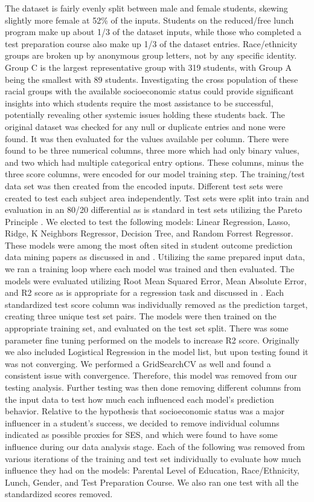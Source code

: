 \documentclass[man,floatsintext]{apa6} %
\begin{document}
The dataset is fairly evenly split between male and female students, skewing slightly more female at 52\% of the inputs. Students on the reduced/free lunch program make up about 1/3 of the dataset inputs, while those who completed a test preparation course also make up 1/3 of the dataset entries. Race/ethnicity groups are broken up by anonymous group letters, not by any specific identity. Group C is the largest representative group with 319 students, with Group A being the smallest with 89 students. Investigating the cross population of these racial groups with the available socioeconomic status could provide significant insights into which students require the most assistance to be successful, potentially revealing other systemic issues holding these students back.
The original dataset was checked for any null or duplicate entries and none were found. It was then evaluated for the values available per column. There were found to be three numerical columns, three more which had only binary values, and two which had multiple categorical entry options. These columns, minus the three score columns, were encoded for our model training step.
The training/test data set was then created from the encoded inputs. Different test sets were created to test each subject area independently. Test sets were split into train and evaluation in an 80/20 differential as is standard in test sets utilizing the Pareto Principle \cite{ParetoSplit}.
We elected to test the following models: Linear Regression, Lasso, Ridge, K Neighbors Regressor, Decision Tree, and Random Forrest Regressor. These models were among the most often sited in student outcome prediction data mining papers as discussed in \cite{MLMoodle} and \cite{dataMineLit}. Utilizing the same prepared input data, we ran a training loop where each model was trained and then evaluated. The models were evaluated utilizing Root Mean Squared Error, Mean Absolute Error, and R2 score as is appropriate for a regression task and discussed in \cite{measuremetrics}.
Each standardized test score column was individually removed as the prediction target, creating three unique test set pairs. The models were then trained on the appropriate training set, and evaluated on the test set split. There was some parameter fine tuning performed on the models to increase R2 score.  Originally we also included Logistical Regression in the model list, but upon testing found it was not converging. We performed a GridSearchCV as well and found a consistent issue with convergence. Therefore, this model was removed from our testing analysis.
Further testing was then done removing different columns from the input data to test how much each influenced each model's prediction behavior. Relative to the hypothesis that socioeconomic status was a major influencer in a student's success, we decided to remove individual columns indicated as possible proxies for SES, and which were found to have some influence during our data analysis stage. Each of the following was removed from various iterations of the training and test set individually to evaluate how much influence they had on the models: Parental Level of Education, Race/Ethnicity, Lunch, Gender, and Test Preparation Course. We also ran one test with all the standardized scores removed.
\end{document}
